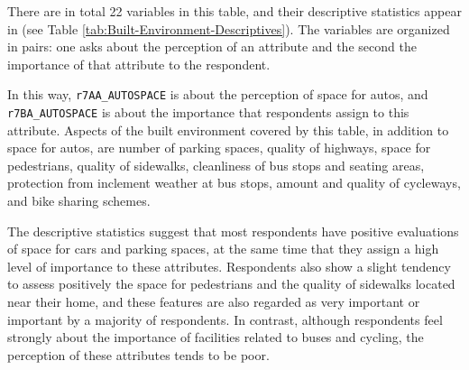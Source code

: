 \documentclass[
11pt, %
oneside, %
english, %
singlespacing, %
]{macthesis} %
\begin{document}
There are in total 22 variables in this table, and their descriptive statistics appear in (see Table \ref{tab:Built-Environment-Descriptives}). The variables are organized in pairs: one asks about the perception of an attribute and the second the importance of that attribute to the respondent.

In this way, \texttt{r7AA\_AUTOSPACE} is about the perception of space for autos, and \texttt{r7BA\_AUTOSPACE} is about the importance that respondents assign to this attribute. Aspects of the built environment covered by this table, in addition to space for autos, are number of parking spaces, quality of highways, space for pedestrians, quality of sidewalks, cleanliness of bus stops and seating areas, protection from inclement weather at bus stops, amount and quality of cycleways, and bike sharing schemes.

The descriptive statistics suggest that most respondents have positive evaluations of space for cars and parking spaces, at the same time that they assign a high level of importance to these attributes. Respondents also show a slight tendency to assess positively the space for pedestrians and the quality of sidewalks located near their home, and these features are also regarded as very important or important by a majority of respondents. In contrast, although respondents feel strongly about the importance of facilities related to buses and cycling, the perception of these attributes tends to be poor.
\end{document}
